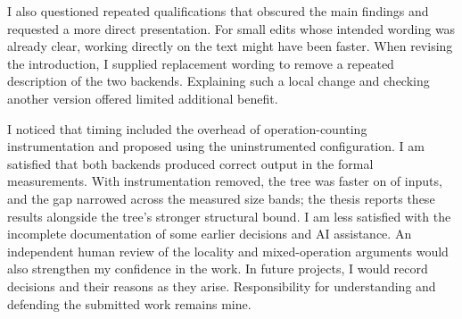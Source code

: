 I also questioned repeated qualifications that obscured the main findings and
requested a more direct presentation. For small edits whose intended wording was
already clear, working directly on the text might have been faster. When revising
the introduction, I supplied replacement wording to remove a repeated description
of the two backends. Explaining such a local change and checking another version
offered limited additional benefit.

I noticed that timing included the overhead of operation-counting
instrumentation and proposed using the uninstrumented configuration.
I am satisfied that both backends produced correct output in the formal
measurements. With instrumentation removed, the tree was faster on
\UnifiedWins{} of \UnifiedN{} inputs, and the gap narrowed across the measured
size bands; the thesis reports these results alongside the tree's stronger
structural bound. I am less satisfied with the incomplete
documentation of some earlier decisions and AI assistance. An independent human
review of the locality and mixed-operation arguments would also strengthen my
confidence in the work. In future projects, I would record decisions and their
reasons as they arise. Responsibility for understanding and defending the
submitted work remains mine.

